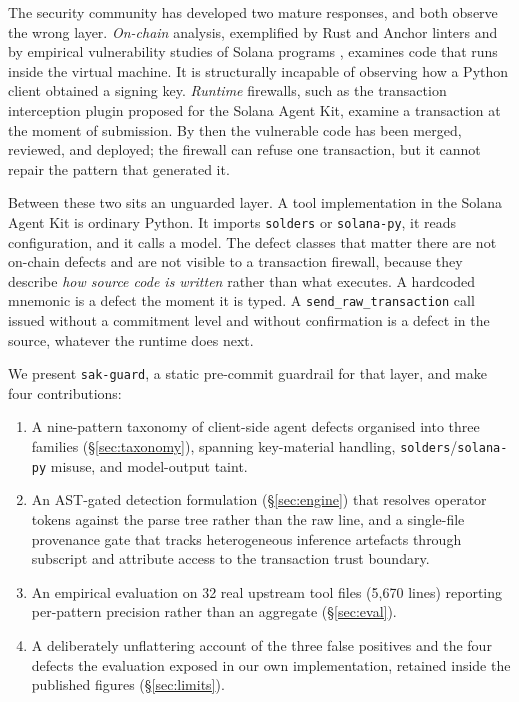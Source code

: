 The security community has developed two mature responses, and both observe
the wrong layer. \emph{On-chain} analysis, exemplified by Rust and Anchor
linters and by empirical vulnerability studies of Solana programs
\cite{zhao2025soleker,tob2024solanalints}, examines code that runs inside the
virtual machine. It is structurally incapable of observing how a Python client
obtained a signing key. \emph{Runtime} firewalls, such as the transaction
interception plugin proposed for the Solana Agent Kit, examine a transaction at
the moment of submission. By then the vulnerable code has been merged,
reviewed, and deployed; the firewall can refuse one transaction, but it cannot
repair the pattern that generated it.

Between these two sits an unguarded layer. A tool implementation in the Solana
Agent Kit is ordinary Python. It imports \texttt{solders} or \texttt{solana-py},
it reads configuration, and it calls a model. The defect classes that matter
there are not on-chain defects and are not visible to a transaction firewall,
because they describe \emph{how source code is written} rather than what
executes. A hardcoded mnemonic is a defect the moment it is typed. A
\texttt{send\_raw\_transaction} call issued without a commitment level and
without confirmation is a defect in the source, whatever the runtime does next.

We present \texttt{sak-guard}, a static pre-commit guardrail for that layer, and
make four contributions:

\begin{enumerate}
\item A nine-pattern taxonomy of client-side agent defects organised into three
  families (\S\ref{sec:taxonomy}), spanning key-material handling,
  \texttt{solders}/\texttt{solana-py} misuse, and model-output taint.
\item An AST-gated detection formulation (\S\ref{sec:engine}) that resolves
  operator tokens against the parse tree rather than the raw line, and a
  single-file provenance gate that tracks heterogeneous inference artefacts
  through subscript and attribute access to the transaction trust boundary.
\item An empirical evaluation on 32 real upstream tool files (5{,}670 lines)
  reporting per-pattern precision rather than an aggregate
  (\S\ref{sec:eval}).
\item A deliberately unflattering account of the three false positives and the
  four defects the evaluation exposed in our own implementation, retained
  inside the published figures (\S\ref{sec:limits}).
\end{enumerate}

